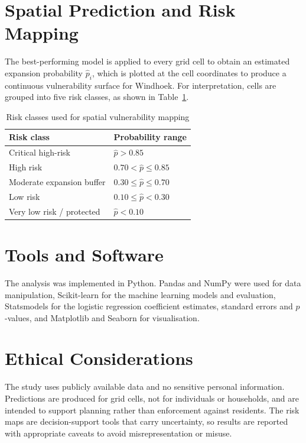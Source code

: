 \section{Spatial Prediction and Risk Mapping}

The best-performing model is applied to every grid cell to obtain an estimated
expansion probability $\hat{p}_i$, which is plotted at the cell coordinates to
produce a continuous vulnerability surface for Windhoek. For interpretation,
cells are grouped into five risk classes, as shown in Table~\ref{tab:classes}.

\begin{table}[ht]
\centering
\caption{Risk classes used for spatial vulnerability mapping}
\label{tab:classes}
\begin{tabular}{ll}
\toprule
Risk class & Probability range \\
\midrule
Critical high-risk         & $\hat{p} > 0.85$ \\
High risk                  & $0.70 < \hat{p} \le 0.85$ \\
Moderate expansion buffer  & $0.30 \le \hat{p} \le 0.70$ \\
Low risk                   & $0.10 \le \hat{p} < 0.30$ \\
Very low risk / protected  & $\hat{p} < 0.10$ \\
\bottomrule
\end{tabular}
\end{table}

\section{Tools and Software}

The analysis was implemented in Python. Pandas and NumPy were used for data
manipulation, Scikit-learn for the machine learning models and evaluation,
Statsmodels for the logistic regression coefficient estimates, standard errors
and $p$-values, and Matplotlib and Seaborn for visualisation.

\section{Ethical Considerations}

The study uses publicly available data and no sensitive personal information.
Predictions are produced for grid cells, not for individuals or households, and
are intended to support planning rather than enforcement against residents. The
risk maps are decision-support tools that carry uncertainty, so results are
reported with appropriate caveats to avoid misrepresentation or misuse.

